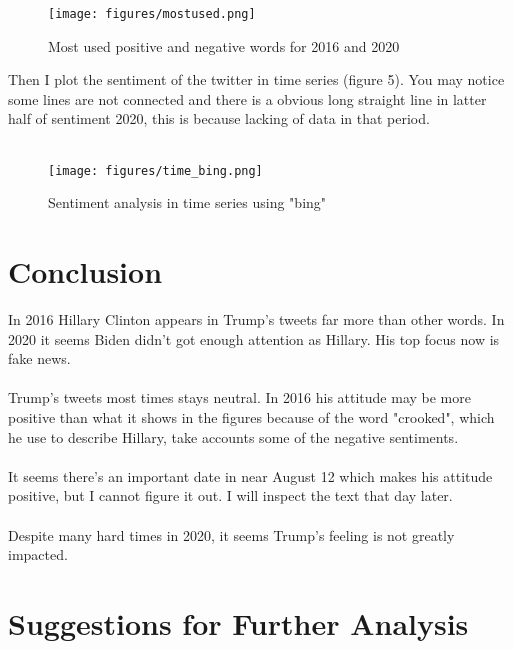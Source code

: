 \documentclass{article}
\begin{document}
\begin{figure}[h]
    \centering
    \texttt{[image: figures/mostused.png]}
    \caption{Most used positive and negative words for 2016 and 2020}
    \label{mostused}
\end{figure}


Then I plot the sentiment of the twitter in time series (figure 5). You may notice some lines are not connected and there is a obvious long straight line in latter half of sentiment 2020, this is because lacking of data in that period.\\ \hspace*{\fill} \\

\begin{figure}[h]
    \centering
    \texttt{[image: figures/time\_bing.png]}
    \caption{Sentiment analysis in time series using "bing"}
    \label{time_bing}
\end{figure}


\section{Conclusion}

In 2016 Hillary Clinton appears in Trump's tweets far more than other words. In 2020 it seems Biden didn't got enough attention as Hillary. His top focus now is fake news.
\\ \hspace*{\fill} \\
Trump's tweets most times stays neutral. In 2016 his attitude may be more positive than what it shows in the figures because of the word "crooked", which he use to describe Hillary, take accounts some of the negative sentiments.
\\ \hspace*{\fill} \\
It seems there's an important date in near August 12 which makes his attitude positive, but I cannot figure it out. I will inspect the text that day later.
\\ \hspace*{\fill} \\
Despite many hard times in 2020, it seems Trump's feeling is not greatly impacted.

\section{Suggestions for Further Analysis}
\end{document}
